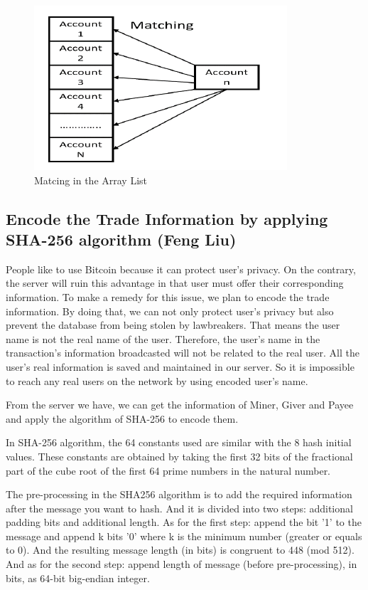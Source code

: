 \documentclass[conference]{IEEEtran}
\begin{document}
\begin{figure}[ht]
	\centering
	\includegraphics[scale=0.6]{fig1.png}
	\caption{Matcing in the Array List}
	\label{fig:label}
\end{figure}

\subsection{Encode the Trade Information by applying SHA-256 algorithm (Feng Liu)}
People like to use Bitcoin because it can protect user’s privacy. On the contrary, the server will ruin this advantage in that user must offer their corresponding information. To make a remedy for this issue, we plan to encode the trade information. By doing that, we can not only protect user’s privacy but also prevent the database from being stolen by lawbreakers. That means the user name is not the real name of the user. Therefore, the user’s name in the transaction’s information broadcasted will not be related to the real user. All the user’s real information is saved and maintained in our server. So it is impossible to reach any real users on the network by using encoded user’s name.

From the server we have, we can get the information of Miner, Giver and Payee and apply the algorithm of SHA-256 to encode them.

In SHA-256 algorithm, the 64 constants used are similar with the 8 hash initial values. These constants are obtained by taking the first 32 bits of the fractional part of the cube root of the first 64 prime numbers in the natural number.

The pre-processing in the SHA256 algorithm is to add the required information after the message you want to hash. And it is divided into two steps: additional padding bits and additional length. As for the first step: append the bit '1' to the message and append k bits '0' where k is the minimum number (greater or equals to 0). And the resulting message length (in bits) is congruent to 448 (mod 512). And as for the second step: append length of message (before pre-processing), in bits, as 64-bit big-endian integer.
\end{document}
